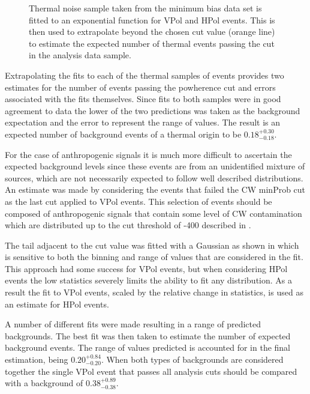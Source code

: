 \begin{figure}[htpb]
\hfill
{}
\caption{Thermal noise sample taken from the minimum bias data set is fitted to an exponential function for VPol and HPol events. This is then used to extrapolate beyond the chosen cut value (orange line) to estimate the expected number of thermal events passing the cut in the analysis data sample.}
\label{fig:Analysis:Background-Estimation:Thermal-Background}
\end{figure}

Extrapolating the fits to each of the thermal samples of events provides two estimates for the number of events passing the powherence cut and errors associated with the fits themselves. Since fits to both samples were in good agreement to data the lower of the two predictions was taken as the background expectation and the error to represent the range of values. The result is an expected number of background events of a thermal origin to be $0.18^{+0.30}_{-0.18}$.

For the case of anthropogenic signals it is much more difficult to ascertain the expected background levels since these events are from an unidentified mixture of sources, which are not necessarily expected to follow well described distributions. An estimate was made by considering the events that failed the CW minProb cut as the last cut applied to VPol events. This selection of events should be composed of anthropogenic signals that contain some level of CW contamination which are distributed up to the cut threshold of -400 described in . 

The tail adjacent to the cut value was fitted with a Gaussian as shown in  which is sensitive to both the binning and range of values that are considered in the fit. This approach had some success for VPol events, but when considering HPol events the low statistics severely limits the ability to fit any distribution. As a result the fit to VPol events, scaled by the relative change in statistics, is used as an estimate for HPol events.

A number of different fits were made resulting in a range of predicted backgrounds. The best fit was then taken to estimate the number of expected background events. The range of values predicted is accounted for in the final estimation, being $0.20^{+0.84}_{-0.20}$. When both types of backgrounds are considered together the single VPol event that passes all analysis cuts should be compared with a background of $0.38^{+0.89}_{-0.38}$.


